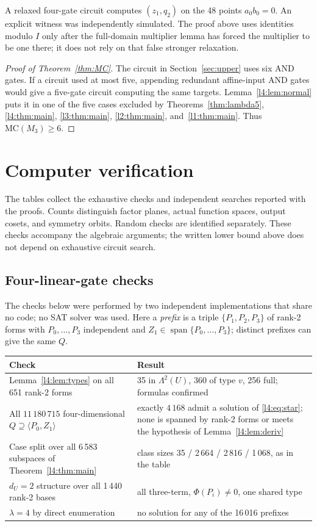 \documentclass[11pt,a4paper]{article}
\theoremstyle{plain}
\theoremstyle{remark}
\newcommand{\Span}{\operatorname{span}}
\newcommand{\Lam}{\Lambda^2}
\newcommand{\dU}{d_U}
\begin{document}
A relaxed four-gate circuit computes $(z_1,q_2)$ on the 48 points $a_0b_0=0$. An explicit witness was independently simulated. The proof above uses identities modulo $I$ only after the full-domain multiplier lemma has forced the multiplier to be one there; it does not rely on that false stronger relaxation.


\begin{proof}[Proof of Theorem~\ref{thm:MC}]
The circuit in Section~\ref{sec:upper} uses six AND gates. If a circuit used at most five, appending redundant affine-input AND gates would give a five-gate circuit computing the same targets. Lemma~\ref{l4:lem:normal} puts it in one of the five cases excluded by Theorems~\ref{thm:lambda5}, \ref{l4:thm:main}, \ref{l3:thm:main}, \ref{l2:thm:main}, and~\ref{l1:thm:main}. Thus $\mathrm{MC}(M_3)\ge6$.
\end{proof}

\section{Computer verification}\label{sec:verification}
The tables collect the exhaustive checks and independent searches reported with the proofs. Counts distinguish factor planes, actual function spaces, output cosets, and symmetry orbits. Random checks are identified separately. These checks accompany the algebraic arguments; the written lower bound above does not depend on exhaustive circuit search.

\subsection{Four-linear-gate checks}


The checks below were performed by two independent implementations that share no code; no SAT solver was used. Here a \emph{prefix} is a triple $\{P_1,P_2,P_3\}$ of rank-2 forms with $P_0,\dots,P_3$ independent and $Z_1\in\Span\{P_0,\dots,P_3\}$; distinct prefixes can give the same $Q$.

\begin{center}
\begin{tabularx}{0.95\textwidth}{@{}X X@{}}
\toprule
Check & Result \\
\midrule
Lemma~\ref{l4:lem:types} on all 651 rank-2 forms & 35 in $\Lam(U)$, 360 of type $v$, 256 full; formulas confirmed\\
All $11\,180\,715$ four-dimensional $Q\supseteq\langle P_0,Z_1\rangle$ & exactly $4\,168$ admit a solution of \eqref{l4:eq:star}; none is spanned by rank-2 forms or meets the hypothesis of Lemma~\ref{l4:lem:deriv}\\
Case split over all 6\,583 subspaces of Theorem~\ref{l4:thm:main} & class sizes 35 / 2\,664 / 2\,816 / 1\,068, as in the table\\
$\dU=2$ structure over all 1\,440 rank-2 bases & all three-term, $\Phi(P_i)\ne0$, one shared type\\
$\lambda=4$ by direct enumeration & no solution for any of the 16\,016 prefixes\\
\bottomrule
\end{tabularx}
\end{center}
\end{document}
